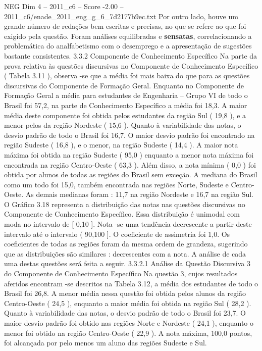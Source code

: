 \begin{textsample}{NEG Dim 4 – 2011\_c6 – Score -2.00 – 2011\_c6/enade\_2011\_eng\_g\_6\_7d2177b9ec.txt}
Por outro lado, houve um grande número de redações bem escritas e precisas, no que se refere ao que foi exigido pela questão.
Foram análises equilibradas e \textbf{sensatas}, correlacionando a problemática do analfabetismo com o desemprego e a apresentação de sugestões bastante consistentes. 3.3.2 Componente de Conhecimento Específico Na parte da prova relativa às questões discursivas no Componente de Conhecimento Específico ( Tabela 3.11 ), observa -se que a média foi mais baixa do que para as questões discursivas do Componente de Formação Geral.
Enquanto no Componente de Formação Geral a média para estudantes de Engenharia – Grupo VI de todo o Brasil foi 57,2, na parte de Conhecimento Específico a média foi 18,3.
A maior média deste componente foi obtida pelos estudantes da região Sul ( 19,8 ), e a menor pelos da região Nordeste ( 15,6 ).
Quanto à variabilidade das notas, o desvio padrão de todo o Brasil foi 16,7.
O maior desvio padrão foi encontrado na região Sudeste ( 16,8 ), e o menor, na região Sudeste ( 14,4 ).
A maior nota máxima foi obtida na região Sudeste ( 95,0 ) enquanto a menor nota máxima foi encontrada na região Centro-Oeste ( 63,3 ).
Além disso, a nota mínima ( 0,0 ) foi obtida por alunos de todas as regiões do Brasil sem exceção.
A mediana do Brasil como um todo foi 15,0, também encontrada nas regiões Norte, Sudeste e Centro-Oeste.
As demais medianas foram : 11,7 na região Nordeste e 16,7 na região Sul.
O Gráfico 3.18 representa a distribuição das notas nas questões discursivas no Componente de Conhecimento Específico.
Essa distribuição é unimodal com moda no intervalo de [ 0,10 ].
Nota -se uma tendência decrescente a partir deste intervalo até o intervalo ( 90,100 ].
O coeficiente de assimetria foi 1,0.
Os coeficientes de todas as regiões foram da mesma ordem de grandeza, sugerindo que as distribuições são similares : decrescentes com a nota.
A análise de cada uma destas questões será feita a seguir. 3.3.2.1 Análise da Questão Discursiva 3 do Componente de Conhecimento Específico Na questão 3, cujos resultados aferidos encontram -se descritos na Tabela 3.12, a média dos estudantes de todo o Brasil foi 26,8.
A menor média nessa questão foi obtida pelos alunos da região Centro-Oeste ( 24,5 ), enquanto a maior média foi obtida na região Sul ( 28,2 ).
Quanto à variabilidade das notas, o desvio padrão de todo o Brasil foi 23,7.
O maior desvio padrão foi obtido nas regiões Norte e Nordeste ( 24,1 ), enquanto o menor foi obtido na região Centro-Oeste ( 22,9 ).
A nota máxima, 100,0 pontos, foi alcançada por pelo menos um aluno das regiões Sudeste e Sul.

\end{textsample}
